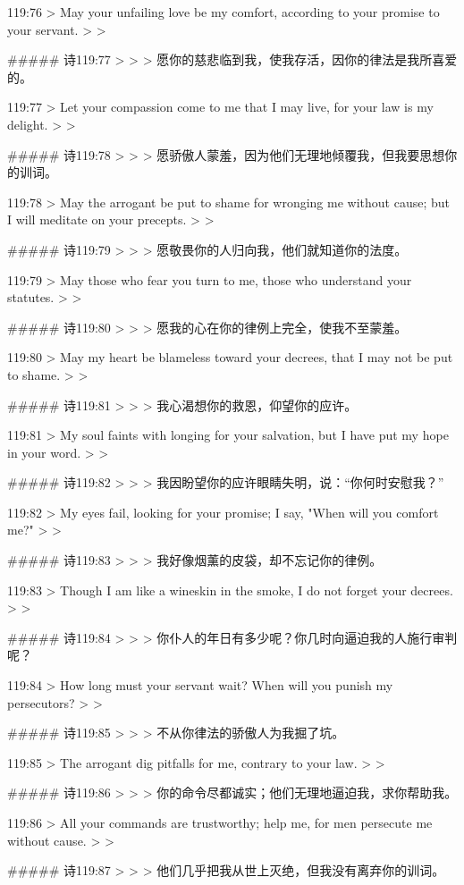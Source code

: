 119:76
> May your unfailing love be my comfort, according to your promise to your servant.
>
> 


##### 诗119:77
> 
>
> 愿你的慈悲临到我，使我存活，因你的律法是我所喜爱的。


119:77
> Let your compassion come to me that I may live, for your law is my delight.
>
> 


##### 诗119:78
> 
>
> 愿骄傲人蒙羞，因为他们无理地倾覆我，但我要思想你的训词。


119:78
> May the arrogant be put to shame for wronging me without cause; but I will meditate on your precepts.
>
> 


##### 诗119:79
> 
>
> 愿敬畏你的人归向我，他们就知道你的法度。


119:79
> May those who fear you turn to me, those who understand your statutes.
>
> 


##### 诗119:80
> 
>
> 愿我的心在你的律例上完全，使我不至蒙羞。


119:80
> May my heart be blameless toward your decrees, that I may not be put to shame.
>
> 


##### 诗119:81
> 
>
> 我心渴想你的救恩，仰望你的应许。


119:81
> My soul faints with longing for your salvation, but I have put my hope in your word.
>
> 


##### 诗119:82
> 
>
> 我因盼望你的应许眼睛失明，说：“你何时安慰我？”


119:82
> My eyes fail, looking for your promise; I say, "When will you comfort me?"
>
> 


##### 诗119:83
> 
>
> 我好像烟薰的皮袋，却不忘记你的律例。


119:83
> Though I am like a wineskin in the smoke, I do not forget your decrees.
>
> 


##### 诗119:84
> 
>
> 你仆人的年日有多少呢？你几时向逼迫我的人施行审判呢？


119:84
> How long must your servant wait? When will you punish my persecutors?
>
> 


##### 诗119:85
> 
>
> 不从你律法的骄傲人为我掘了坑。


119:85
> The arrogant dig pitfalls for me, contrary to your law.
>
> 


##### 诗119:86
> 
>
> 你的命令尽都诚实；他们无理地逼迫我，求你帮助我。


119:86
> All your commands are trustworthy; help me, for men persecute me without cause.
>
> 


##### 诗119:87
> 
>
> 他们几乎把我从世上灭绝，但我没有离弃你的训词。


